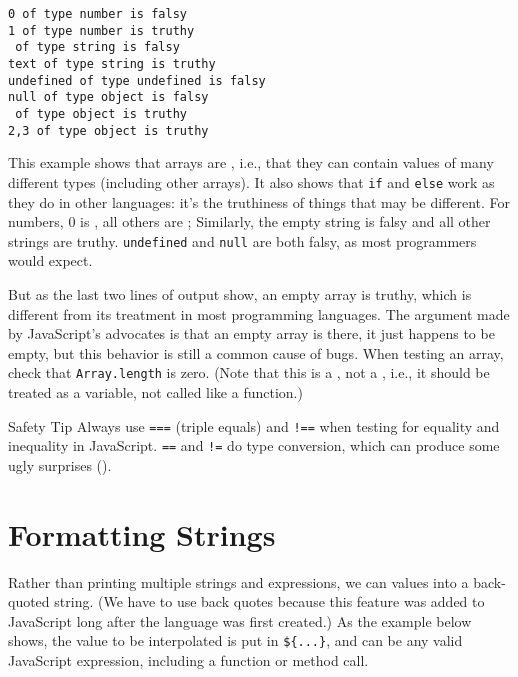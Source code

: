 \begin{verbatim}
0 of type number is falsy
1 of type number is truthy
 of type string is falsy
text of type string is truthy
undefined of type undefined is falsy
null of type object is falsy
 of type object is truthy
2,3 of type object is truthy
\end{verbatim}

This example shows that arrays are ,
i.e.,
that they can contain values of many different types
(including other arrays).
It also shows that \texttt{if} and \texttt{else} work as they do in other languages:
it's the truthiness of things that may be different.
For numbers,
0 is , all others are ;
Similarly,
the empty string is falsy and all other strings are truthy.
\texttt{undefined} and \texttt{null} are both falsy,
as most programmers would expect.

But as the last two lines of output show,
an empty array is truthy,
which is different from its treatment in most programming languages.
The argument made by JavaScript's advocates is that an empty array is there,
it just happens to be empty,
but this behavior is still a common cause of bugs.
When testing an array,
check that \texttt{Array.length} is zero.
(Note that this is a ,
not a ,
i.e.,
it should be treated as a variable,
not called like a function.)

\begin{aside}{Safety Tip}
  Always use \texttt{===} (triple equals) and \texttt{!==} when testing for equality and inequality in JavaScript.
  \texttt{==} and \texttt{!=} do type conversion,
  which can produce some ugly surprises ().
\end{aside}

\section{Formatting Strings}\label{s:basics-formatting}

Rather than printing multiple strings and expressions,
we can  values into a back-quoted string.
(We have to use back quotes because this feature was added to JavaScript
long after the language was first created.)
As the example below shows,
the value to be interpolated is put in \texttt{\$\{...\}},
and can be any valid JavaScript expression,
including a function or method call.

